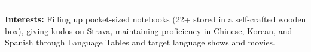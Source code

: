 \documentclass[12pt, a4paper]{article}
\begin{document}



\vspace{-4mm}
\rule{\linewidth}{0.4pt}

\textbf{Interests:} Filling up pocket-sized notebooks (22+ stored in a self-crafted wooden box), giving kudos on Strava, maintaining proficiency in Chinese, Korean, and Spanish through Language Tables and target language shows and movies.

\end{document}
